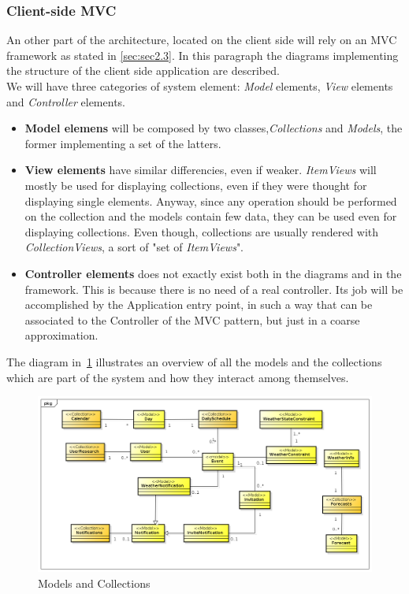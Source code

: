 \subsubsection{Client-side MVC}
An other part of the architecture, located on the client side will rely on an MVC framework as stated in \autoref{sec:sec2.3}.
In this paragraph the diagrams implementing the structure of the client side application are described.\\
We will have three categories of system element: \textit{Model} elements, \textit{View} elements and \textit{Controller} elements.
\begin{itemize}
\item \textbf{Model elemens} will be composed by two classes,\textit{Collections} and \textit{Models}, the former implementing a set of the latters.
\item \textbf{View elements} have similar differencies, even if weaker. \textit{ItemViews} will mostly be used for displaying collections, even if they were thought for displaying single elements. Anyway, since any operation should be performed on the collection and the models contain few data, they can be used even for displaying collections. Even though, collections are usually rendered with \textit{CollectionViews}, a sort of "set of \textit{ItemViews}".
\item \textbf{Controller elements} does not exactly exist both in the diagrams and in the framework. This is because there is no need of a real controller. Its job will be accomplished by the Application entry point, in such a way that can be associated to the Controller of the MVC pattern, but just in a coarse approximation.
\end{itemize}
The diagram in~\ref{fig:modelovervie} illustrates an overview of all the models and the collections which are part of the system and how they interact among themselves.
 \begin{center}
 \begin{figure}[H]
    \includegraphics[width=1\textwidth]{../MVCDiagram/MVCBackbone/AllModelsAndCollections.png}
    \caption{Models and Collections}
     \label{fig:modelovervie}
     \end{figure}
   \end{center}  

